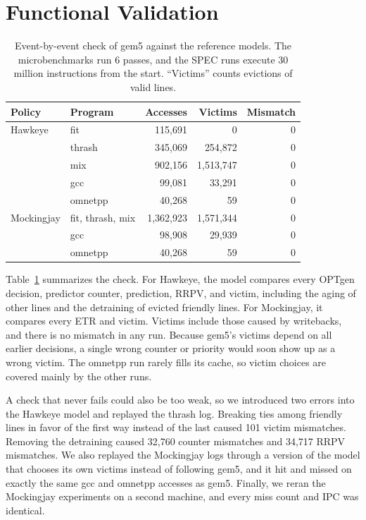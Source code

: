 \documentclass[11pt,conference]{IEEEtran}
\begin{document}
\section{Functional Validation}
\label{sec:valid}

\begin{table}[t]
\centering
\caption{Event-by-event check of gem5 against the reference models. The
microbenchmarks run 6 passes, and the SPEC runs execute 30 million
instructions from the start. ``Victims'' counts evictions of valid lines.}
\label{tab:valid}
\setlength{\tabcolsep}{2.5pt}
\begin{tabular}{@{}llrrr@{}}
\toprule
Policy & Program & Accesses & Victims & Mismatch \\
\midrule
Hawkeye & fit & 115,691 & 0 & 0 \\
& thrash & 345,069 & 254,872 & 0 \\
& mix & 902,156 & 1,513,747 & 0 \\
& gcc & 99,081 & 33,291 & 0 \\
& omnetpp & 40,268 & 59 & 0 \\
\midrule
Mockingjay & fit, thrash, mix & 1,362,923 & 1,571,344 & 0 \\
& gcc & 98,908 & 29,939 & 0 \\
& omnetpp & 40,268 & 59 & 0 \\
\bottomrule
\end{tabular}
\end{table}

Table~\ref{tab:valid} summarizes the check. For Hawkeye, the model compares
every OPTgen decision, predictor counter, prediction, RRPV, and victim,
including the aging of other lines and the detraining of evicted friendly
lines. For Mockingjay, it compares every ETR and victim. Victims include those
caused by writebacks, and there is no mismatch in any run.
Because gem5's victims depend on all earlier decisions, a single wrong counter
or priority would soon show up as a wrong victim. The omnetpp run rarely
fills its cache, so victim choices are covered mainly by the other runs.

A check that never fails could also be too weak, so we introduced two errors
into the Hawkeye model and replayed the thrash log. Breaking ties among
friendly lines in favor of the first way instead of the last caused 101 victim
mismatches. Removing the detraining caused 32,760 counter mismatches and 34,717
RRPV mismatches. We also replayed the Mockingjay logs through a version of the
model that chooses its own victims instead of following gem5, and it hit and
missed on exactly the same gcc and omnetpp accesses as gem5. Finally, we reran
the Mockingjay experiments on a second machine, and every miss count and IPC
was identical.
\end{document}
